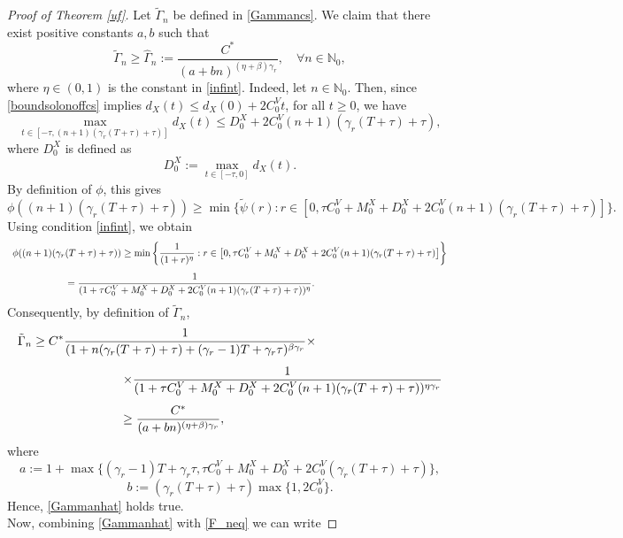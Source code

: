 \documentclass[11pt]{article}
\begin{document}
    \begin{proof}[Proof of Theorem \ref{uf}]
    Let $\tilde\Gamma_n$ be defined in \eqref{Gammancs}. We claim that there exist positive constants $a,b$ such that
    \begin{equation}\label{Gammanhat}
        \tilde{\Gamma}_n\geq \hat{\Gamma}_n:=\frac{C^*}{(a+bn)^{(\eta+\beta)\gamma_r}},\quad \forall n\in\mathbb{N}_0,
    \end{equation}
    where $\eta\in (0,1)$ is the constant in \eqref{infint}.
    Indeed, let $n\in\mathbb{N}_0$. Then, since \eqref{boundsolonoffcs} implies $d_X(t)\leq d_X(0)+2C_0^Vt$, for all $t\geq 0$, we have
    $$\max_{t\in[-\tau,(n+1)(\gamma_r(T+\tau)+\tau)]}d_X(t)\leq D_0^X+2C_0^V(n+1)(\gamma_r(T+\tau)+\tau),$$
    where $D_0^X$ is defined as $$D_0^X:=\max_{t\in [-\tau,0]}d_X(t).$$
    By definition of $\phi$, this gives
    $$\phi((n+1)(\gamma_r(T+\tau)+\tau))\geq \min\{\tilde\psi(r):r\in \left[0,\tau C_0^V+M_0^X+D_0^X+2C_0^V(n+1)(\gamma_r(T+\tau)+\tau)\right] \}.$$
    Using condition \eqref{infint}, we obtain
    $$\begin{array}{l}
    \vspace{0.3cm}\displaystyle{\phi((n+1)(\gamma_r(T+\tau)+\tau))\geq \min\left\{\frac{1}{(1+r)^\eta}:r\in \left[0,\tau C_0^V+M_0^X+D_0^X+2C_0^V(n+1)(\gamma_r(T+\tau)+\tau)\right] \right\}}\\
    \displaystyle{\hspace{2cm}=\frac{1}{(1+\tau C_0^V+M_0^X+D_0^X+2C_0^V(n+1)(\gamma_r(T+\tau)+\tau))^\eta}.}
    \end{array}$$
    Consequently, by definition of $\tilde\Gamma_n$,
    $$\begin{array}{l}
    \vspace{0.3cm}\displaystyle{\tilde\Gamma_n\geq C^*\frac{1}{(1+n(\gamma_r(T+\tau)+\tau)+(\gamma_r-1)T+\gamma_r\tau)^{\beta\gamma_r}}\times}\\ \vspace{0.3cm}
    \displaystyle{\hspace{3cm}\times\frac{1}{(1+\tau C_0^V+M_0^X+D_0^X+2C_0^V(n+1)(\gamma_r(T+\tau)+\tau))^{\eta\gamma_r}}}\\
    \displaystyle{\hspace{3cm}\geq \frac{C^*}{(a+b n)^{(\eta+\beta)\gamma_r}},}
    \end{array}$$
    where $$a:=1+\max\{(\gamma_r-1)T+\gamma_r\tau, \tau C_0^V+M_0^X+D_0^X+2C_0^V(\gamma_r(T+\tau)+\tau)\},$$
    $$b:=(\gamma_r(T+\tau)+\tau)\max\{1,2C_0^V\}.$$
    Hence, \eqref{Gammanhat} holds true. 
    \\Now, combining \eqref{Gammanhat} with \eqref{F_neq} we can write

\end{proof}
\end{document}
